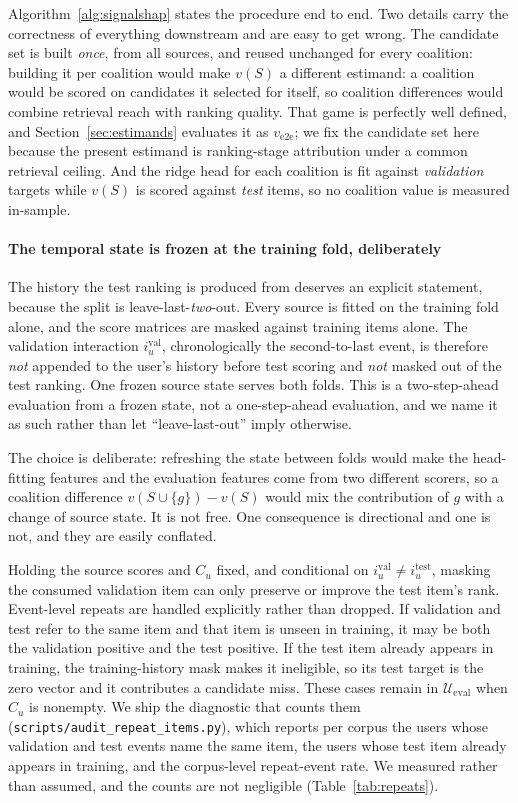 \documentclass[pdflatex,sn-basic,Numbered]{sn-jnl}
\theoremstyle{plain}
\theoremstyle{definition}
\newcommand{\Ueval}{\mathcal{U}_{\mathrm{eval}}}
\begin{document}
Algorithm~\ref{alg:signalshap} states the procedure end to end. Two details
carry the correctness of everything downstream and are easy to get wrong. The
candidate set is built \emph{once}, from all sources, and reused unchanged for
every coalition: building it per coalition would make $v(S)$
a different estimand: a coalition would be scored on candidates it selected for
itself, so coalition differences would combine retrieval reach with ranking
quality. That game is perfectly well defined, and Section~\ref{sec:estimands}
evaluates it as $v_{\mathrm{e2e}}$; we fix the candidate set here because the
present estimand is ranking-stage attribution under a common retrieval
ceiling. And the ridge head for each coalition is fit
against \emph{validation} targets while $v(S)$ is scored against \emph{test}
items, so no coalition value is measured in-sample.

\paragraph{The temporal state is frozen at the training fold, deliberately}
The history the test ranking is produced from deserves an explicit statement,
because the split is leave-last-\emph{two}-out.
Every source is fitted on the training fold alone, and the score matrices are
masked against training items alone. The validation interaction
$i_u^{\mathrm{val}}$, chronologically the second-to-last event, is therefore
\emph{not} appended to the user's history before test scoring and \emph{not}
masked out of the test ranking. One frozen source state serves both folds. This
is a two-step-ahead evaluation from a frozen state, not a one-step-ahead
evaluation, and we name it as such rather than let ``leave-last-out'' imply
otherwise.

The choice is deliberate: refreshing the state between folds would make the
head-fitting features and the evaluation features come from two different
scorers, so a coalition difference $v(S \cup \{g\}) - v(S)$ would mix the
contribution of $g$ with a change of source state. It is not free. One
consequence is directional and one is not, and they are easily conflated.

Holding the source scores and $C_u$ fixed, and conditional on
$i_u^{\mathrm{val}}\ne i_u^{\mathrm{test}}$, masking the consumed validation
item can only preserve or improve the test item's rank. Event-level repeats are
handled explicitly rather than dropped. If validation and test refer to the
same item and that item is unseen in training, it may be both the validation
positive and the test positive. If the test item already appears in training,
the training-history mask makes it ineligible, so its test target is the zero
vector and it contributes a candidate miss. These cases remain in $\Ueval$ when
$C_u$ is nonempty. We ship the diagnostic that counts them
(\texttt{scripts/audit\_repeat\_items.py}), which reports per corpus the users
whose validation and test events name the same item, the users whose test item
already appears in training, and the corpus-level repeat-event rate. We
measured rather than assumed, and the counts are not negligible
(Table~\ref{tab:repeats}).
\end{document}

